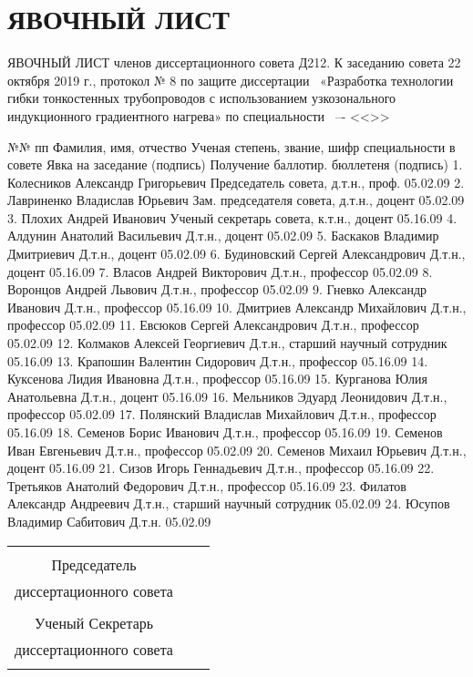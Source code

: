 


\section{ЯВОЧНЫЙ ЛИСТ}


ЯВОЧНЫЙ ЛИСТ
членов диссертационного совета Д212.
К заседанию совета 22 октября 2019 г., протокол № 8
по защите диссертации \thesisAuthorLastNameFromFull\
«Разработка технологии гибки тонкостенных трубопроводов 
с использованием узкозонального индукционного градиентного нагрева» 
по специальности \thesisSpecialtyNumber\ –- <<\thesisSpecialtyTitle>>

№№ пп	Фамилия, имя, 
отчество	Ученая степень, 
звание, шифр 
специальности в 
совете	Явка на заседание (подпись)	Получение баллотир. бюллетеня (подпись)
1.	Колесников Александр Григорьевич	Председатель совета, д.т.н., проф. 05.02.09		
2. 	Лавриненко Владислав Юрьевич	Зам. председателя совета, д.т.н., доцент 05.02.09		
3.	Плохих Андрей 
Иванович	Ученый секретарь совета, к.т.н., доцент 05.16.09		
4. 	Алдунин Анатолий 
Васильевич	Д.т.н., доцент
05.02.09		
5.	Баскаков Владимир Дмитриевич	Д.т.н., доцент
05.02.09		
6.	Будиновский Сергей Александрович	Д.т.н., доцент
05.16.09		
7.	Власов Андрей 
Викторович	Д.т.н., профессор
05.02.09		
8.	Воронцов Андрей Львович	Д.т.н., профессор
05.02.09		
9.	Гневко Александр 
Иванович	Д.т.н., профессор
05.16.09		
10.	Дмитриев Александр Михайлович	Д.т.н., профессор
05.02.09		
11.	Евсюков Сергей 
Александрович	Д.т.н., профессор
05.02.09		
12.	Колмаков Алексей
Георгиевич	Д.т.н., старший 
научный сотрудник
05.16.09		
13.	Крапошин Валентин
Сидорович	Д.т.н., профессор
05.16.09		
14.	Куксенова Лидия
Ивановна	Д.т.н., профессор
05.16.09		
15.	Курганова Юлия
Анатольевна	Д.т.н., доцент
05.16.09		
16.	Мельников Эдуард
Леонидович	Д.т.н., профессор
05.02.09		
17.	Полянский Владислав
Михайлович	Д.т.н., профессор
05.16.09		
18.	Семенов Борис
Иванович	Д.т.н., профессор
05.16.09		
19.	Семенов Иван
Евгеньевич	Д.т.н., профессор
05.02.09		
20.	Семенов Михаил 
Юрьевич	Д.т.н., доцент
05.16.09		
21.	Сизов Игорь 
Геннадьевич	Д.т.н., профессор
05.16.09		
22.	Третьяков Анатолий
Федорович	Д.т.н., профессор
05.16.09		
23.	Филатов Александр Андреевич	Д.т.н., старший 
научный сотрудник
05.02.09		
24.	Юсупов Владимир 
Сабитович	Д.т.н. 05.02.09		



\begin{center}
	\begin{tabular}[c]{c m{4cm} l}
		&            &                     \\
		Председатель       &            &                     \\
		диссертационного совета & \hrulefill & \dcHeadFullFIO      \\
		\dcHeadRegalia      &            &                     \\
		Ученый Секретарь     &            &                     \\
		диссертационного совета & \hrulefill & \dcSecretaryFullFIO \\
		\dcSecretaryRegalia   &            &
	\end{tabular}
\end{center}

\clearpage
